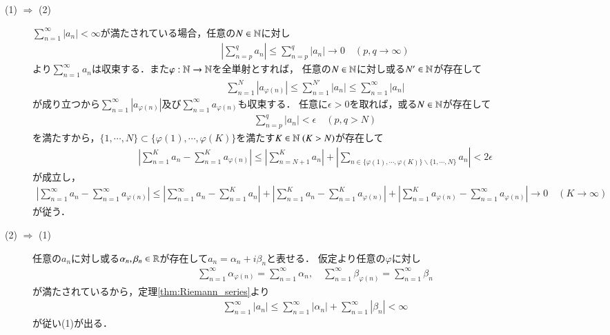 	\begin{prf}\mbox{}
		\begin{description}
			\item[(1) $\Rightarrow$ (2)]
				$\sum_{n=1}^{\infty} |a_n| < \infty$が満たされている場合，任意の$N \in \mathbb{N}$に対し
				\begin{align}
					\left| \sum_{n=p}^{q} a_n \right| \leq \sum_{n=p}^{q} |a_n| \longrightarrow 0
					\quad (p,q \longrightarrow \infty)
				\end{align}
				より$\sum_{n=1}^{\infty} a_n$は収束する．また$\varphi:\mathbb{N} \rightarrow \mathbb{N}$を全単射とすれば，
				任意の$N \in \mathbb{N}$に対し或る$N' \in \mathbb{N}$が存在して
				\begin{align}
					\sum_{n=1}^{N} \left| a_{\varphi(n)} \right|
					\leq \sum_{n=1}^{N'} \left| a_n \right|
					\leq \sum_{n=1}^{\infty} \left| a_n \right|
				\end{align}
				が成り立つから$\sum_{n=1}^{\infty} \left| a_{\varphi(n)} \right|$及び$\sum_{n=1}^{\infty} a_{\varphi(n)}$も収束する．
				任意に$\epsilon > 0$を取れば，或る$N \in \mathbb{N}$が存在して
				\begin{align}
					\sum_{n=p}^{q} |a_n| < \epsilon
					\quad (p,q > N)
				\end{align}
				を満たすから，$\{1,\cdots,N\} \subset \{\varphi(1),\cdots,\varphi(K)\}$を満たす$K \in \mathbb{N}\ (K > N)$が存在して
				\begin{align}
					\left| \sum_{n=1}^{K} a_n - \sum_{n=1}^{K} a_{\varphi(n)} \right|
					\leq \left| \sum_{n=N+1}^K a_n \right| + \left| \sum_{n \in \{\varphi(1),\cdots,\varphi(K)\} \backslash \{1,\cdots,N\}} a_n \right|
					< 2 \epsilon
				\end{align}
				が成立し，
				\begin{align}
					\left| \sum_{n=1}^{\infty} a_n - \sum_{n=1}^{\infty} a_{\varphi(n)} \right|
					\leq \left| \sum_{n=1}^{\infty} a_n - \sum_{n=1}^{K} a_n \right|
						+ \left| \sum_{n=1}^{K} a_n - \sum_{n=1}^{K} a_{\varphi(n)} \right|
						+ \left| \sum_{n=1}^{K} a_{\varphi(n)} - \sum_{n=1}^{\infty} a_{\varphi(n)} \right|
					\longrightarrow 0
					\quad (K \longrightarrow \infty)
				\end{align}
				が従う．
				
			\item[(2) $\Rightarrow$ (1)]
				任意の$a_n$に対し或る$\alpha_n,\beta_n \in \mathbb{R}$が存在して$a_n = \alpha_n + i \beta_n$と表せる．
				仮定より任意の$\varphi$に対し
				\begin{align}
					\sum_{n=1}^{\infty} \alpha_{\varphi(n)} = \sum_{n=1}^{\infty} \alpha_n,
					\quad \sum_{n=1}^{\infty} \beta_{\varphi(n)} = \sum_{n=1}^{\infty} \beta_n
				\end{align}
				が満たされているから，定理\ref{thm:Riemann_series}より
				\begin{align}
					\sum_{n=1}^\infty |a_n| \leq \sum_{n=1}^{\infty} |\alpha_n| + \sum_{n=1}^{\infty} |\beta_n| < \infty
				\end{align}
				が従い(1)が出る．
				\QED
				
		\end{description}
	\end{prf}